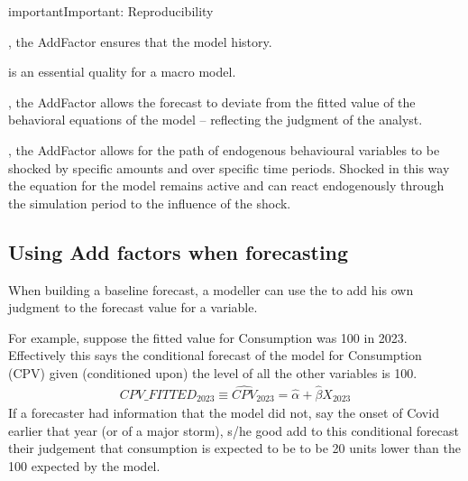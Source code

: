 \documentclass[letterpaper,10pt,english]{jupyterBook}
\begin{document}
\begin{sphinxadmonition}{important}{Important:}
\sphinxAtStartPar
Reproducibility

\sphinxAtStartPar
{}, the Add\sphinxhyphen{}Factor ensures that the model  history.

\sphinxAtStartPar
{} is an essential quality for a macro model.

\sphinxAtStartPar
{}, the Add\sphinxhyphen{}Factor allows the forecast to deviate from the fitted value of the behavioral equations of the model – reflecting the judgment of the analyst.

\sphinxAtStartPar
{}, the Add\sphinxhyphen{}Factor allows for the path of endogenous behavioural variables to be shocked by specific amounts and over specific time periods. Shocked in this way the equation for the model remains active and can react endogenously through the simulation period to the influence of the shock.
\end{sphinxadmonition}


\subsection{Using Add factors when forecasting}
\label{\detokenize{content/05_SimpleModel/SimpleModel:using-add-factors-when-forecasting}}
\sphinxAtStartPar
When building a baseline forecast, a modeller can use the  to add his own judgment to the forecast value for a variable.

\sphinxAtStartPar
For example, suppose the fitted value for Consumption was 100 in 2023.  Effectively this says the conditional forecast of the model for Consumption (CPV) given (conditioned upon) the level of all the other variables is 100.
\begin{equation*}
\begin{split} CPV\_FITTED_{2023} \equiv \hat{CPV}_{2023} = \hat{\alpha} + \hat{\beta} X_2023  \end{split}
\end{equation*}
\sphinxAtStartPar
If a forecaster had information that the model did not, say the onset of Covid earlier that year (or of a major storm), s/he good add to this conditional forecast their judgement that consumption is expected to be to be 20 units lower than the 100 expected by the model.
\end{document}

